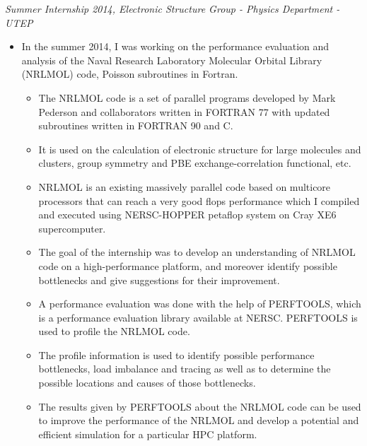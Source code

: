 \documentclass[margin]{res}
\begin{document}
\begin{resume}
\begin{itemize}
\end{itemize}
%
{\sl Summer Internship 2014,  Electronic Structure Group - Physics Department - UTEP} %
\begin{itemize}\itemsep -2pt
\item In the summer 2014, I was working on the performance evaluation and analysis of the
Naval Research Laboratory Molecular Orbital Library (NRLMOL) code, Poisson subroutines in Fortran.
\begin{itemize}
\item The NRLMOL code is a set of parallel programs developed by Mark Pederson and collaborators written in FORTRAN 77
with updated subroutines written in FORTRAN 90 and C.
\item It is used on the calculation of electronic structure for large molecules and clusters, group symmetry and PBE exchange-correlation functional, etc. 
\item NRLMOL is an existing massively parallel code based on multicore processors that can reach a very good flops performance which I compiled and executed using NERSC-HOPPER petaflop system on Cray XE6 supercomputer.
\item The goal of the internship was to develop an understanding of NRLMOL code on a high-performance platform, and moreover identify possible bottlenecks and give suggestions for their improvement. 
\item A performance evaluation was done with the help of PERFTOOLS, which is a performance evaluation library available at NERSC.
PERFTOOLS is used to profile the NRLMOL code. 
\item The profile information is used to identify possible performance bottlenecks, load imbalance and tracing as well as to determine the possible locations and causes of those bottlenecks.
\item The results given by PERFTOOLS about the NRLMOL code can be used to improve the performance of the NRLMOL and develop a potential and efficient simulation for a particular HPC platform.
\end{itemize}


\end{itemize}
\end{resume}
\end{document}
